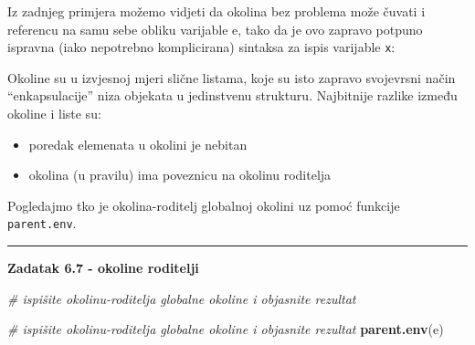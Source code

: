 \documentclass[]{book}
\newenvironment{Shaded}{\begin{snugshade}}{\end{snugshade}}
\newcommand{\KeywordTok}[1]{\textcolor[rgb]{0.13,0.29,0.53}{\textbf{#1}}}
\newcommand{\CommentTok}[1]{\textcolor[rgb]{0.56,0.35,0.01}{\textit{#1}}}
\newcommand{\OperatorTok}[1]{\textcolor[rgb]{0.81,0.36,0.00}{\textbf{#1}}}
\newcommand{\NormalTok}[1]{#1}
\providecommand{\tightlist}{%
  \setlength{\itemsep}{0pt}\setlength{\parskip}{0pt}}
\theoremstyle{definition}
\theoremstyle{definition}
\theoremstyle{definition}
\theoremstyle{remark}
\begin{document}
Iz zadnjeg primjera možemo vidjeti da okolina bez problema može čuvati i
referencu na samu sebe obliku varijable e, tako da je ovo zapravo
potpuno ispravna (iako nepotrebno komplicirana) sintaksa za ispis
varijable \texttt{x}:

\begin{Shaded}
\end{Shaded}

Okoline su u izvjesnoj mjeri slične listama, koje su isto zapravo
svojevrsni način ``enkapsulacije'' niza objekata u jedinstvenu
strukturu. Najbitnije razlike između okoline i liste su:

\begin{itemize}
\tightlist
\item
  poredak elemenata u okolini je nebitan
\item
  okolina (u pravilu) ima poveznicu na okolinu roditelja
\end{itemize}

Pogledajmo tko je okolina-roditelj globalnoj okolini uz pomoć funkcije
\texttt{parent.env}.

\begin{center}\rule{0.5\linewidth}{\linethickness}\end{center}

\textbf{Zadatak 6.7 - okoline roditelji}

\begin{Shaded}
\begin{Highlighting}[]
\CommentTok{# ispišite okolinu-roditelja globalne okoline i objasnite rezultat}
\end{Highlighting}
\end{Shaded}

\begin{Shaded}
\begin{Highlighting}[]
\CommentTok{# ispišite okolinu-roditelja globalne okoline i objasnite rezultat}
\KeywordTok{parent.env}\NormalTok{(e)}
\end{Highlighting}
\end{Shaded}
\end{document}
